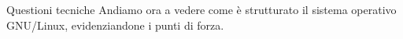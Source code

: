 \begin{slide}{Questioni tecniche}
Andiamo ora a vedere come è strutturato il sistema operativo GNU/Linux,
evidenziandone i punti di forza.
\end{slide}
